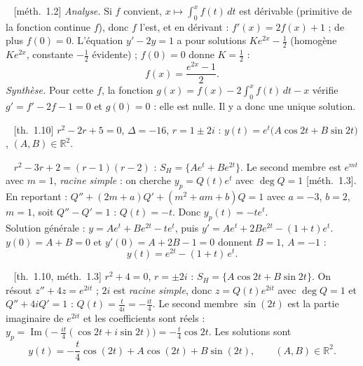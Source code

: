 \documentclass[a4paper,11pt]{article}
\newcommand{\R}{\mathbb{R}}\newcommand{\C}{\mathbb{C}}\newcommand{\K}{\mathbb{K}}
\newcommand{\q}[1]{\par\needspace{3\baselineskip}\smallskip{\sffamily\bfseries\color{Bleu}#1}\ }
\newcommand{\prop}[1]{{\sffamily\footnotesize\color{Gris}[#1]}}
\begin{document}
\q{3.} \prop{méth.~1.2} \emph{Analyse.} Si $f$ convient, $x\mapsto\int_0^xf(t)\,dt$ est dérivable (primitive de la fonction
continue $f$), donc $f$ l'est, et en dérivant : $f'(x)=2f(x)+1$ ; de plus $f(0)=0$. L'équation $y'-2y=1$ a pour solutions
$Ke^{2x}-\frac12$ (homogène $Ke^{2x}$, constante $-\frac12$ évidente) ; $f(0)=0$ donne $K=\frac12$ :
\[f(x)=\frac{e^{2x}-1}2.\]
\emph{Synthèse.} Pour cette $f$, la fonction $g(x)=f(x)-2\int_0^xf(t)\,dt-x$ vérifie $g'=f'-2f-1=0$ et $g(0)=0$ : elle est
nulle. Il y a donc une unique solution.

\q{4.a)} \prop{th.~1.10} $r^2-2r+5=0$, $\Delta=-16$, $r=1\pm2i$ : $y(t)=e^{t}\big(A\cos2t+B\sin2t\big)$, $(A,B)\in\R^2$.

\q{4.b)} $r^2-3r+2=(r-1)(r-2)$ : $S_H=\{Ae^{t}+Be^{2t}\}$. Le second membre est $e^{mt}$ avec $m=1$, \emph{racine simple} : on
cherche $y_p=Q(t)e^{t}$ avec $\deg Q=1$ \prop{méth.~1.3}. En reportant :
$Q''+(2m+a)Q'+(m^2+am+b)Q=1$ avec $a=-3$, $b=2$, $m=1$, soit $Q''-Q'=1$ : $Q(t)=-t$. Donc $y_p(t)=-te^{t}$.\\
Solution générale : $y=Ae^{t}+Be^{2t}-te^{t}$, puis $y'=Ae^{t}+2Be^{2t}-(1+t)e^{t}$.\\
$y(0)=A+B=0$ et $y'(0)=A+2B-1=0$ donnent $B=1$, $A=-1$ :
\[y(t)=e^{2t}-(1+t)\,e^{t}.\]

\q{5.} \prop{th.~1.10, méth.~1.3} $r^2+4=0$, $r=\pm2i$ : $S_H=\{A\cos2t+B\sin2t\}$. On résout $z''+4z=e^{2it}$ ; $2i$ est
\emph{racine simple}, donc $z=Q(t)e^{2it}$ avec $\deg Q=1$ et $Q''+4iQ'=1$ : $Q(t)=\frac t{4i}=-\frac{it}4$. Le second membre
$\sin(2t)$ est la partie imaginaire de $e^{2it}$ et les coefficients sont réels :
$y_p=\operatorname{Im}\Big(-\frac{it}4(\cos2t+i\sin2t)\Big)=-\frac t4\cos2t$. Les solutions sont
\[y(t)=-\frac t4\cos(2t)+A\cos(2t)+B\sin(2t),\qquad(A,B)\in\R^2.\]
\end{document}
